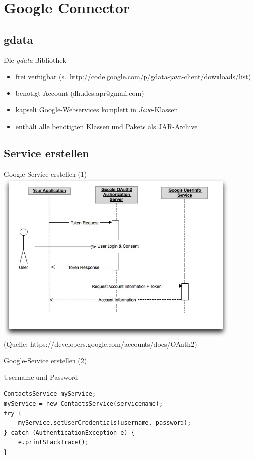 \section{Google Connector}
\subsection*{gdata}

\begin{frame}{Die \emph{gdata}-Bibliothek}
 \begin{itemize}
 	\item frei verfügbar (s.\ http://code.google.com/p/gdata-java-client/downloads/list)
 	\item benötigt Account (dli.ides.api@gmail.com)
 	\item kapselt Google-Webservices komplett in \emph{Java}-Klassen
 	\item enthält alle benötigten Klassen und Pakete als JAR-Archive
 \end{itemize}
\end{frame}

\subsection*{Service erstellen}

\begin{frame}[fragile]{Google-Service erstellen (1)}
\includegraphics[width=0.9\textwidth]{Bilder/googleOauth.jpg}\\
(Quelle: https://developers.google.com/accounts/docs/OAuth2)
\end{frame}

\begin{frame}[fragile]{Google-Service erstellen (2)}
\begin{block}{Username und Password}
\javalstset
\begin{lstlisting}
ContactsService myService;
myService = new ContactsService(servicename);
try {
	myService.setUserCredentials(username, password);
} catch (AuthenticationException e) {
	e.printStackTrace();
}
\end{lstlisting}
\end{block}
\end{frame}

